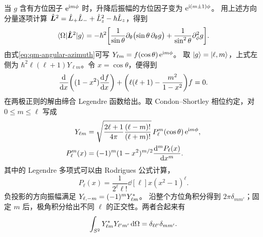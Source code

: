 当 $g$ 含有方位因子 $\e^{\i m\phi}$ 时，升降后振幅的方位因子变为 $\e^{\i(m\pm1)\phi}$。
用上述方向分量逐项计算 $\opbm L^2 = \op L_+\op L_- + \op L_z^2 - \hbar\op L_z$，得到
\begin{equation}
    \mel{\Omega}{\opbm L^2}{g}
        = -\hbar^2\biggb{\frac{1}{\sin\theta}\p_\theta\bigp{\sin\theta\,\p_\theta g}
                       + \frac{1}{\sin^2\theta}\p_\phi^2 g}.
    \label{eq:qm-angular-laplacian}
\end{equation}
由式\eqref{eq:qm-angular-azimuth}可写 $Y_{\ell m} = f(\cos\theta)\e^{\i m\phi}$。
取 $\ket g = \ket{\ell,m}$，上式左侧为 $\hbar^2\ell(\ell + 1)Y_{\ell m}$。令 $x = \cos\theta$，便得到
\begin{equation}
    \dd{x}\biggp{(1 - x^2)\dv{f}{x}}
        + \biggp{\ell(\ell + 1) - \frac{m^2}{1 - x^2}}f = 0 .
\end{equation}
在两极正则的解由缔合 Legendre 函数给出。取 Condon--Shortley 相位约定，对 $0 \le m \le \ell$ 写成
\begin{subequations}
    \begin{align}
        Y_{\ell m} &= \sqrt{\frac{2\ell + 1}{4\pi}\frac{(\ell - m)!}{(\ell + m)!}}\,
            P_\ell^m(\cos\theta)\e^{\i m\phi},\\
        P_\ell^m(x) &= (-1)^m(1 - x^2)^{m/2}\dv[m]{P_\ell(x)}{x}.
    \end{align}
\end{subequations}
其中的 Legendre 多项式可以由 Rodrigues 公式计算，
\begin{equation}
    P_\ell(x) = \frac{1}{2^\ell\ell!}\dd[\ell]{x}(x^2 - 1)^\ell .
\end{equation}
负投影的方向振幅满足 $Y_{\ell,-m} = (-1)^m Y_{\ell m}\conj$。
沿整个方位角积分得到 $2\pi\delta_{mm'}$；固定 $m$ 后，极角积分给出不同 $\ell$ 的正交性。两者合起来有
\begin{equation}
    \int_{S^2}Y_{\ell m}\conj Y_{\ell' m'}\d\Omega = \delta_{\ell\ell'}\delta_{mm'}.
\end{equation}

